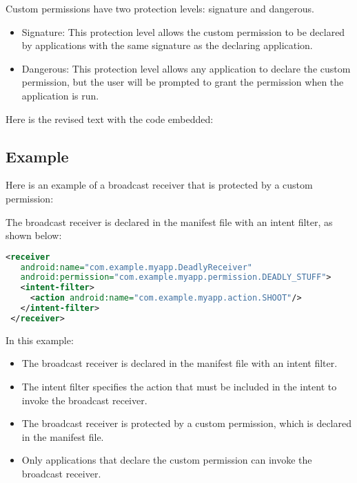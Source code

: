 \documentclass{article}
\begin{document}
Custom permissions have two protection levels: signature and dangerous.

\begin{itemize}
\item Signature: This protection level allows the custom permission to be declared by applications with the same signature as the declaring application.
\item Dangerous: This protection level allows any application to declare the custom permission, but the user will be prompted to grant the permission when the application is run.
\end{itemize}

Here is the revised text with the code embedded:

\subsection{Example}

Here is an example of a broadcast receiver that is protected by a custom permission:

The broadcast receiver is declared in the manifest file with an intent filter, as shown below:

\begin{lstlisting}[language=xml]
<receiver
   android:name="com.example.myapp.DeadlyReceiver"
   android:permission="com.example.myapp.permission.DEADLY_STUFF">
   <intent-filter>
     <action android:name="com.example.myapp.action.SHOOT"/>
   </intent-filter>
 </receiver>
\end{lstlisting}

In this example:

\begin{itemize}
\item The broadcast receiver is declared in the manifest file with an intent filter.
\item The intent filter specifies the action that must be included in the intent to invoke the broadcast receiver.
\item The broadcast receiver is protected by a custom permission, which is declared in the manifest file.
\item Only applications that declare the custom permission can invoke the broadcast receiver.
\end{itemize}
\end{document}
